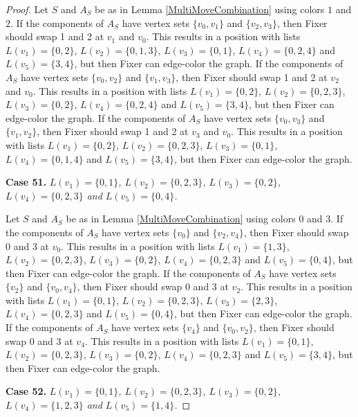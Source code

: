\documentclass[12pt]{amsart}
\theoremstyle{plain}
\theoremstyle{definition}
\theoremstyle{remark}
\begin{document}
\begin{proof}
Let $S$ and $A_S$ be as in Lemma \ref{MultiMoveCombination} using colors $1$ and $2$. If the components of $A_S$ have vertex sets $\{v_0, v_1\}$ and $\{v_2, v_3\}$, then Fixer should swap 1 and 2 at $v_1$ and $v_0$. This results in a position with lists $L(v_1) = \{0, 2\}$, $L(v_2) = \{0, 1, 3\}$, $L(v_3) = \{0, 1\}$, $L(v_4) = \{0, 2, 4\}$ and $L(v_5) = \{3, 4\}$, but then Fixer can edge-color the graph.
If the components of $A_S$ have vertex sets $\{v_0, v_2\}$ and $\{v_1, v_3\}$, then Fixer should swap 1 and 2 at $v_2$ and $v_0$. This results in a position with lists $L(v_1) = \{0, 2\}$, $L(v_2) = \{0, 2, 3\}$, $L(v_3) = \{0, 2\}$, $L(v_4) = \{0, 2, 4\}$ and $L(v_5) = \{3, 4\}$, but then Fixer can edge-color the graph.
If the components of $A_S$ have vertex sets $\{v_0, v_3\}$ and $\{v_1, v_2\}$, then Fixer should swap 1 and 2 at $v_3$ and $v_0$. This results in a position with lists $L(v_1) = \{0, 2\}$, $L(v_2) = \{0, 2, 3\}$, $L(v_3) = \{0, 1\}$, $L(v_4) = \{0, 1, 4\}$ and $L(v_5) = \{3, 4\}$, but then Fixer can edge-color the graph.

\noindent\textbf{Case 51.  }\textit{$L(v_1) = \{0, 1\}$, $L(v_2) = \{0, 2, 3\}$, $L(v_3) = \{0, 2\}$, $L(v_4) = \{0, 2, 3\}$ and $L(v_5) = \{0, 4\}$.}

Let $S$ and $A_S$ be as in Lemma \ref{MultiMoveCombination} using colors $0$ and $3$. If the components of $A_S$ have vertex sets $\{v_0\}$ and $\{v_2, v_4\}$, then Fixer should swap 0 and 3 at $v_0$. This results in a position with lists $L(v_1) = \{1, 3\}$, $L(v_2) = \{0, 2, 3\}$, $L(v_3) = \{0, 2\}$, $L(v_4) = \{0, 2, 3\}$ and $L(v_5) = \{0, 4\}$, but then Fixer can edge-color the graph.
If the components of $A_S$ have vertex sets $\{v_2\}$ and $\{v_0, v_4\}$, then Fixer should swap 0 and 3 at $v_2$. This results in a position with lists $L(v_1) = \{0, 1\}$, $L(v_2) = \{0, 2, 3\}$, $L(v_3) = \{2, 3\}$, $L(v_4) = \{0, 2, 3\}$ and $L(v_5) = \{0, 4\}$, but then Fixer can edge-color the graph.
If the components of $A_S$ have vertex sets $\{v_4\}$ and $\{v_0, v_2\}$, then Fixer should swap 0 and 3 at $v_4$. This results in a position with lists $L(v_1) = \{0, 1\}$, $L(v_2) = \{0, 2, 3\}$, $L(v_3) = \{0, 2\}$, $L(v_4) = \{0, 2, 3\}$ and $L(v_5) = \{3, 4\}$, but then Fixer can edge-color the graph.

\noindent\textbf{Case 52.  }\textit{$L(v_1) = \{0, 1\}$, $L(v_2) = \{0, 2, 3\}$, $L(v_3) = \{0, 2\}$, $L(v_4) = \{1, 2, 3\}$ and $L(v_5) = \{1, 4\}$.}


\end{proof}
\end{document}
